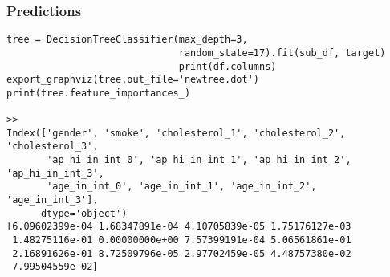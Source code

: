 \begin{frame}[fragile]\frametitle{Predictions}
\begin{lstlisting}
tree = DecisionTreeClassifier(max_depth=3, 
                              random_state=17).fit(sub_df, target)
							  print(df.columns)
export_graphviz(tree,out_file='newtree.dot') 
print(tree.feature_importances_)

>>
Index(['gender', 'smoke', 'cholesterol_1', 'cholesterol_2', 'cholesterol_3',
       'ap_hi_in_int_0', 'ap_hi_in_int_1', 'ap_hi_in_int_2', 'ap_hi_in_int_3',
       'age_in_int_0', 'age_in_int_1', 'age_in_int_2', 'age_in_int_3'],
      dtype='object')
[6.09602399e-04 1.68347891e-04 4.10705839e-05 1.75176127e-03
 1.48275116e-01 0.00000000e+00 7.57399191e-04 5.06561861e-01
 2.16891626e-01 8.72509796e-05 2.97702459e-05 4.48757380e-02
 7.99504559e-02]
\end{lstlisting}
\end{frame}
